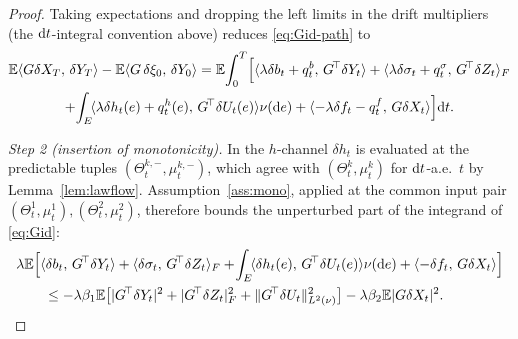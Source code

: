 \begin{proof}
Taking expectations and dropping the left limits in the drift multipliers (the
$\mathrm{d} t$-integral convention above) reduces \eqref{eq:Gid-path} to
\begin{multline}\label{eq:Gid}
\mathbb{E}\langle G\delta X_T,\,\delta Y_T\rangle-\mathbb{E}\langle G\,\delta\xi_0,\,\delta Y_0\rangle
=\mathbb{E}\!\int_0^T\!\Big[\langle \lambda\delta b_t+q^b_t,\,G^{\!\top}\delta Y_t\rangle
+\langle \lambda\delta\sigma_t+q^\sigma_t,\,G^{\!\top}\delta Z_t\rangle_F\\
+\!\int_E\!\langle \lambda\delta h_t(e)+q^h_t(e),\,G^{\!\top}\delta U_t(e)\rangle\nu(\mathrm{d} e)
+\langle -\lambda\delta f_t-q^f_t,\,G\delta X_t\rangle\Big]\mathrm{d} t .
\end{multline}

\emph{Step 2 (insertion of monotonicity).} In the $h$-channel $\delta h_t$ is evaluated at the
predictable tuples $(\Theta^{k,-}_t,\mu^{k,-}_t)$, which agree with $(\Theta^k_t,\mu^k_t)$
for $\mathrm{d} t$-a.e.\ $t$ by Lemma~\ref{lem:lawflow}. Assumption~\ref{ass:mono}, applied at
the common input pair $(\Theta^1_t,\mu^1_t),(\Theta^2_t,\mu^2_t)$, therefore bounds the
unperturbed part of the integrand of \eqref{eq:Gid}:
\begin{equation}\label{eq:intmono}
\begin{aligned}
&\lambda\E\Big[\inner{\delta b_t}{\Gstar\delta Y_t}+\inner{\delta\sigma_t}{\Gstar\delta Z_t}_F
+\!\int_E\!\inner{\delta h_t(e)}{\Gstar\delta U_t(e)}\nu(\diff e)+\inner{-\delta f_t}{G\delta X_t}\Big]\\
&\qquad\le-\lambda\beta_1\E\big[|\Gstar\delta Y_t|^2+|\Gstar\delta Z_t|_F^2+\Lnorm{\Gstar\delta U_t}^2\big]
-\lambda\beta_2\E|G\delta X_t|^2 .
\end{aligned}
\end{equation}


\end{proof}
